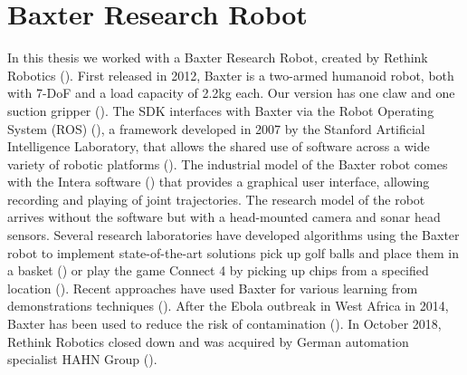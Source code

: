 \section{Baxter Research Robot}\label{sec:baxter}
In this thesis we worked with a Baxter Research Robot, created by Rethink Robotics (\cite{robotics2013baxter}).
First released in 2012, Baxter is a two-armed humanoid robot, both with 7-DoF and a load capacity of 2.2kg each.
Our version has one claw and one suction gripper ().
The SDK interfaces with Baxter via the Robot Operating System (ROS) (\cite{quigley2009ros}), a framework developed in 2007 by the Stanford Artificial Intelligence Laboratory, that allows the shared use of software across a wide variety of robotic platforms (\cite{fernandez2015learning}).
The industrial model of the Baxter robot comes with the Intera software (\cite{intera}) that provides a graphical user interface, allowing recording and playing of joint trajectories.
The research model of the robot arrives without the software but with a head-mounted camera and sonar head sensors.
Several research laboratories have developed algorithms using the Baxter robot to implement state-of-the-art solutions \eg
pick up golf balls and place them in a basket (\cite{BaxterGolf}) or play the game Connect 4 by picking up chips from a specified location (\cite{Connect4}). 
Recent approaches have used Baxter for various learning from demonstrations techniques (\cite{tremblay2018synthetically,yang2016development,li2017neural}).
After the Ebola outbreak in West Africa in 2014, Baxter has been used to reduce the risk of contamination (\cite{Ebola}).
In October 2018, Rethink Robotics closed down and was acquired by German automation specialist HAHN Group (\cite{rethink2018acquired}).





%

